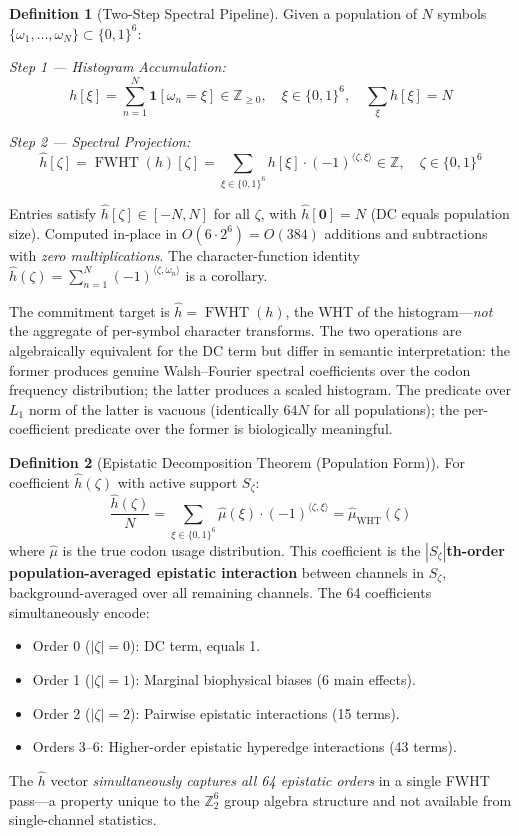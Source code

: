 \documentclass[12pt,letterpaper]{article}
\theoremstyle{definition}
\newtheorem{definition}{Definition}[section]
\theoremstyle{plain}
\theoremstyle{remark}
\newcommand{\FWHT}{\operatorname{FWHT}}
\newcommand{\hhat}{\hat{h}}
\begin{document}
\begin{definition}[Two-Step Spectral Pipeline]
Given a population of $N$ symbols $\{\omega_1,\ldots,\omega_N\} \subset \{0,1\}^6$:

\noindent\textit{Step 1 --- Histogram Accumulation:}
\[
  h[\xi] = \sum_{n=1}^{N} \mathbf{1}[\omega_n = \xi] \in \mathbb{Z}_{\ge 0}, \quad
  \xi \in \{0,1\}^6, \quad \sum_\xi h[\xi] = N
\]

\noindent\textit{Step 2 --- Spectral Projection:}
\[
  \hhat[\zeta] = \FWHT(h)[\zeta] = \sum_{\xi \in \{0,1\}^6} h[\xi] \cdot (-1)^{\langle \zeta, \xi \rangle} \in \mathbb{Z},
  \quad \zeta \in \{0,1\}^6
\]

Entries satisfy $\hhat[\zeta] \in [-N, N]$ for all $\zeta$, with $\hhat[\mathbf{0}] = N$ (DC equals population size). Computed in-place in $O(6 \cdot 2^6) = O(384)$ additions and subtractions with \emph{zero multiplications}. The character-function identity $\hhat(\zeta) = \sum_{n=1}^{N} (-1)^{\langle \zeta, \omega_n \rangle}$ is a corollary.

\begin{warningbox}
The commitment target is $\hhat = \FWHT(h)$, the WHT of the histogram---\emph{not} the aggregate of per-symbol character transforms. The two operations are algebraically equivalent for the DC term but differ in semantic interpretation: the former produces genuine Walsh--Fourier spectral coefficients over the codon frequency distribution; the latter produces a scaled histogram. The predicate over $L_1$ norm of the latter is vacuous (identically $64N$ for all populations); the per-coefficient predicate over the former is biologically meaningful.
\end{warningbox}
\end{definition}

\begin{definition}[Epistatic Decomposition Theorem (Population Form)]
For coefficient $\hhat(\zeta)$ with active support $S_\zeta$:
\[
  \frac{\hhat(\zeta)}{N} = \sum_{\xi \in \{0,1\}^6} \hat{\mu}(\xi) \cdot (-1)^{\langle \zeta,\xi \rangle}
    = \hat{\mu}_{\mathrm{WHT}}(\zeta)
\]
where $\hat{\mu}$ is the true codon usage distribution. This coefficient is the \textbf{$|S_\zeta|$th-order population-averaged epistatic interaction} between channels in $S_\zeta$, background-averaged over all remaining channels. The 64 coefficients simultaneously encode:
\begin{itemize}
  \item Order 0 ($|\zeta|=0$): DC term, equals 1.
  \item Order 1 ($|\zeta|=1$): Marginal biophysical biases (6 main effects).
  \item Order 2 ($|\zeta|=2$): Pairwise epistatic interactions (15 terms).
  \item Orders 3--6: Higher-order epistatic hyperedge interactions (43 terms).
\end{itemize}

The $\hhat$ vector \emph{simultaneously captures all 64 epistatic orders} in a single FWHT pass---a property unique to the $\mathbb{Z}_2^6$ group algebra structure and not available from single-channel statistics.
\end{definition}
\end{document}
